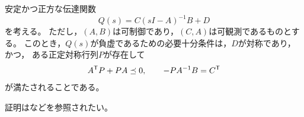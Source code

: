 \documentclass[tombow,dvipdfmx]{corona-a5-1.1}
\begin{document}
\begin{補題}\label{lem:nilem}
安定かつ正方な伝達関数
\[
Q(s)=C(sI-A)^{-1}B + D
\]
を考える。
ただし，$(A,B)$は可制御であり，$(C,A)$は可観測であるものとする。
このとき，$Q(s)$が負虚であるための必要十分条件は，$D$が対称であり，かつ，
ある正定対称行列$P$が存在して
\begin{align*}
A^{\sf T}P+PA \preceq 0
,\qquad
-PA^{-1}B = C^{\sf T}
\end{align*}
が満たされることである。
\end{補題}

証明は\cite[Lemma 7]{xiong2010negative}などを参照されたい。
\end{document}
